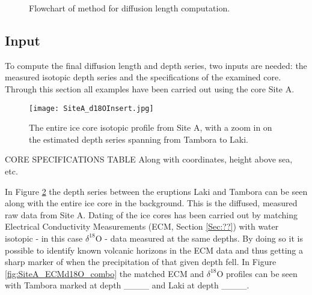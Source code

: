 \documentclass[../../CompleteThesis/Complete_1stDraft.tex]{subfiles}
\begin{document}
\begin{figure}
	\caption[Flowchart]{Flowchart of method for diffusion length computation.}
	\label{Fig:FlowchartDiffLen}
\end{figure}	




\subsection[Input]{Input}
To compute the final diffusion length and depth series, two inputs are needed: the measured isotopic depth series and the specifications of the examined core. Through this section all examples have been carried out using the core Site A.\\
\begin{figure}
	\centering
	\texttt{[image: SiteA\_d18OInsert.jpg]}
	\caption[Full $\delta^{18}$O record with insert, Site A]{The entire ice core isotopic profile from Site A, with a zoom in on the estimated depth series spanning from Tambora to Laki.}
	\label{fig:SiteA_d18OInsert}
\end{figure}

CORE SPECIFICATIONS TABLE 
Along with coordinates, height above sea, etc.



In Figure \ref{fig:SiteA_d18OInsert} the depth series between the eruptions Laki and Tambora can be seen along with the entire ice core in the background. This is the diffused, measured raw data from Site A. Dating of the ice cores has been carried out by matching Electrical Conductivity Measurements (ECM, Section \ref{Sec:??}) with water isotopic - in this case $\delta^{18}$O - data measured at the same depths. By doing so it is possible to identify known volcanic horizons in the ECM data and thus getting a sharp marker of when the precipitation of that given depth fell. In Figure \ref{fig:SiteA_ECMd18O_combo} the matched ECM and $\delta^{18}$O profiles can be seen with Tambora marked at depth \_\_\_\_ and Laki at depth \_\_\_\_.
\end{document}
